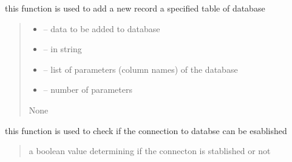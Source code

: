 \documentclass[letterpaper,10pt,english]{sphinxmanual}
\begin{document}
\begin{savenotes}
\begin{fulllineitems}
\begin{savenotes}\begin{fulllineitems}
\label{\detokenize{setting/database:oxin.database.dataBase.add_record}}
\pysigstartsignatures
{}
\pysigstopsignatures
\sphinxAtStartPar
this function is used to add a new record a specified table of database
\begin{quote}\begin{description}
\begin{itemize}
\item {} 
\sphinxAtStartPar
{} – data to be added to database

\item {} 
\sphinxAtStartPar
{} – in string

\item {} 
\sphinxAtStartPar
{} – list of parameters (column names) of the database

\item {} 
\sphinxAtStartPar
{} – number of parameters

\end{itemize}

\sphinxAtStartPar
None

\end{description}\end{quote}

\end{fulllineitems}\end{savenotes}


\begin{savenotes}\begin{fulllineitems}
\label{\detokenize{setting/database:oxin.database.dataBase.check_connection}}
\pysigstartsignatures
{}
\pysigstopsignatures
\sphinxAtStartPar
this function is used to check if the connection to databse can be esablished
\begin{quote}\begin{description}
\sphinxAtStartPar
a boolean value determining if the connecton is stablished or not


\end{description}
\end{quote}
\end{fulllineitems}
\end{savenotes}
\end{fulllineitems}
\end{savenotes}
\end{document}
